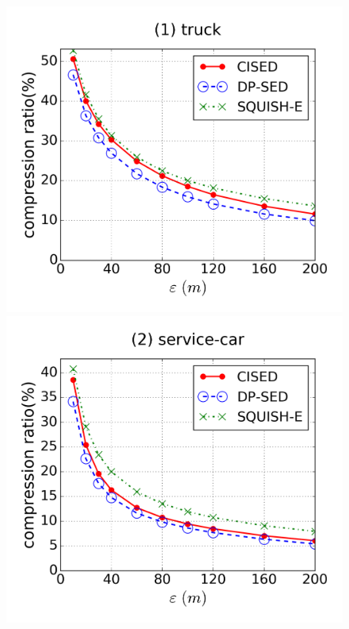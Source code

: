 \begin{figure}[tb!]
\centering
\includegraphics[scale = 0.25]{figures/Exp-cr-epsilon-truck.png}
\includegraphics[scale = 0.25]{figures/Exp-cr-epsilon-service.png}

\end{figure}
